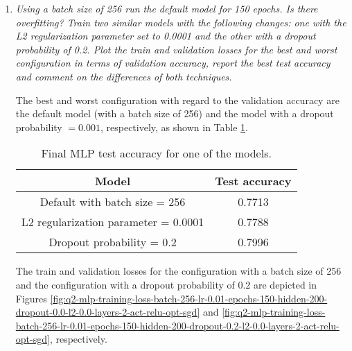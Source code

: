 \documentclass[12pt]{article}
\begin{document}
\begin{enumerate}[leftmargin=\labelsep]
\begin{enumerate}[label=\alph*)]
                    \vspace{12pt}

              \item \textit{Using a batch size of 256 run the default model for 150 epochs. Is there
                        overfitting?
                        Train two similar models with the following changes: one with the L2
                        regularization parameter set to 0.0001 and the other with a dropout probability of 0.2.
                        Plot the train and validation losses for the best and worst configuration in terms of
                        validation accuracy, report the best test accuracy and comment on the differences of
                        both techniques.}

                    \vspace{12pt}

                    The best and worst configuration with regard to the validation accuracy are the default model (with a batch size of 256) and the model with a dropout probability $= 0.001$, respectively, as shown in Table \ref{tab:mlp-configuration-accuracy}.

                    \begin{table}[H]
                        \centering
                        \begin{tabular}{|c|c|}
                            \hline
                            Model                                & Test accuracy \\ \hline
                            Default with batch size = 256        & 0.7713        \\ \hline
                            L2 regularization parameter = 0.0001 & 0.7788        \\ \hline
                            Dropout probability = 0.2            & 0.7996        \\ \hline
                        \end{tabular}
                        \caption{Final MLP test accuracy for one of the models.}
                        \label{tab:mlp-configuration-accuracy}
                    \end{table}


                    The train and validation losses for the configuration with a batch size of 256 and the configuration with a dropout probability of 0.2 are depicted in Figures \ref{fig:q2-mlp-training-loss-batch-256-lr-0.01-epochs-150-hidden-200-dropout-0.0-l2-0.0-layers-2-act-relu-opt-sgd} and \ref{fig:q2-mlp-training-loss-batch-256-lr-0.01-epochs-150-hidden-200-dropout-0.2-l2-0.0-layers-2-act-relu-opt-sgd}, respectively.


\end{enumerate}
\end{enumerate}
\end{document}
